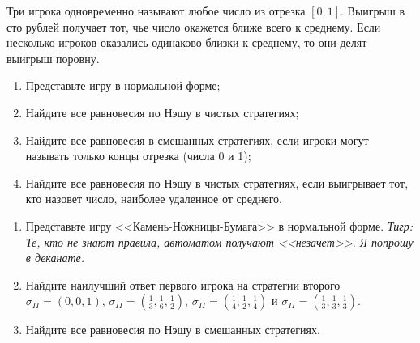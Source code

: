 \begin{problem}\par
\begin{source} \cite{cramton:lectures} \end{source}
Три игрока одновременно называют любое число из отрезка  $\left[0;1\right]$. Выигрыш в сто рублей получает тот, чье число окажется ближе всего к среднему. Если несколько игроков оказались одинаково близки к среднему, то они делят выигрыш поровну.\par
\begin{enumerate}
\item 	Представьте игру в нормальной форме;\par
\item 	Найдите все равновесия по Нэшу в чистых стратегиях;\par
\item 	Найдите все равновесия в смешанных стратегиях, если игроки могут называть только концы отрезка (числа 0 и 1);\par
\item	        Найдите все равновесия по Нэшу в чистых стратегиях, если выигрывает тот, кто назовет число, наиболее удаленное от среднего.
\end{enumerate}


\begin{sol}

\end{sol}
\end{problem}



\begin{problem}
\begin{enumerate}
\item 	Представьте игру <<Камень-Ножницы-Бумага>> в нормальной форме. {\it Тигр: Те, кто не знают правила, автоматом получают <<незачет>>. Я попрошу в деканате.}\par
\item 	Найдите наилучший ответ первого игрока на стратегии второго  $\sigma _{II} =\left(0,0,1\right)$,  $\sigma _{II} =\left(\frac{1}{3},\frac{1}{6},\frac{1}{2} \right)$,  $\sigma _{II} =\left(\frac{1}{4},\frac{1}{2},\frac{1}{4} \right)$  и  $\sigma _{II} =\left(\frac{1}{3},\frac{1}{3},\frac{1}{3} \right)$.\par
\item 	Найдите все равновесия по Нэшу в смешанных стратегиях.
\end{enumerate}

\begin{sol}

\end{sol}
\end{problem}



